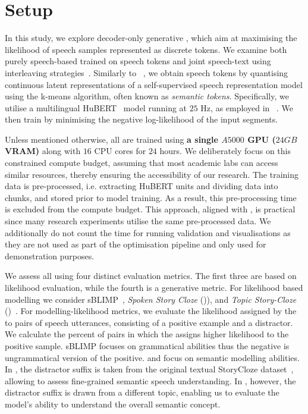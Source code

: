 \section{Setup}
In this study, we explore decoder-only generative \slms, which aim at maximising the likelihood of speech samples represented as discrete tokens. We examine both purely speech-based \slms trained on speech tokens and joint speech-text \slms using interleaving strategies~\citep{spiritlm}. Similarly to ~\citet{twist, gslm}, we obtain speech tokens by quantising continuous latent representations of a self-supervised speech representation model using the k-means algorithm, often known as \emph{semantic tokens}. Specifically, we utilise a multilingual HuBERT~\citep{hubert} model running at $25$ Hz, as employed in ~\citet{twist}. We then train \slms by minimising the negative log-likelihood of the input segments.

Unless mentioned otherwise, all \slms are trained using \textbf{a single $A5000$ GPU ($24GB$ VRAM)} along with $16$ CPU cores for $24$ hours. We deliberately focus on this constrained compute budget, assuming that most academic labs can access similar resources, thereby ensuring the accessibility of our research. The training data is pre-processed, i.e. extracting HuBERT units and dividing data into chunks, and stored prior to model training. As a result, this pre-processing time is excluded from the compute budget. This approach, aligned with \citet{geiping2023cramming}, is practical since many research experiments utilise the same pre-processed data. We additionally do not count the time for running validation and visualisations as they are not used as part of the optimisation pipeline and only used for demonstration purposes.

 We assess all \slms using four distinct evaluation metrics. The first three are based on likelihood evaluation, while the fourth is a generative metric. For likelihood based modelling we consider sBLIMP~\cite{dunbar2021zero}, \emph{Spoken Story Cloze} (\ssc)), and \emph{Topic Story-Cloze} (\tsc)~\cite{twist}. For modelling-likelihood metrics, we evaluate the likelihood assigned by the \slms to pairs of speech utterances, consisting of a positive example and a distractor. We calculate the percent of pairs in which the \slm assigns higher likelihood to the positive sample. sBLIMP focuses on grammatical abilities thus the negative is ungrammatical version of the positive. \ssc and \tsc focus on semantic modelling abilities. In \ssc, the distractor suffix is taken from the original textual StoryCloze dataset~\citep{mostafazadeh2016corpus}, allowing to assess fine-grained semantic speech understanding. In \tsc, however, the distractor suffix is drawn from a different topic, enabling us to evaluate the model’s ability to understand the overall semantic concept. 

